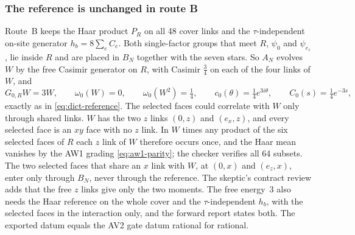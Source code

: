 \subsubsection{The reference is unchanged in route B}
\label{sec:ax2-reference}
Route~B keeps the Haar product $P_R$ on all 48 cover links and the
$\tau$-independent on-site generator $h_b=8\sum_eC_e$. Both single-factor
groups that meet $R$, $\psi_0$ and $\psi_{e_z}$, lie inside $R$ and are placed
in $B_N$ together with the seven stars. So $A_N$ evolves $W$ by the free
Casimir generator on $R$, with Casimir $\tfrac34$ on each of the four links
of $W$, and
\begin{equation}
 G_{0,R}W=3W,\qquad \omega_0(W)=0,\qquad \omega_0(W^2)=\tfrac14,\qquad
 c_0(\theta)=\tfrac14e^{3i\theta},\qquad C_0(s)=\tfrac14e^{-3s},
 \label{eq:ax2-reference}
\end{equation}
exactly as in \eqref{eq:dict-reference}. The selected faces could correlate
with $W$ only through shared links. $W$ has the two $z$ links $(0,z)$ and
$(e_x,z)$, and every selected face is an $xy$ face with no $z$ link. In $W$
times any product of the six selected faces of $R$ each $z$ link of $W$
therefore occurs once, and the Haar mean vanishes by the AW1 grading
\eqref{eq:aw1-parity}; the checker verifies all 64 subsets. The two selected
faces that share an $x$ link with $W$, at $(0,x)$ and $(e_z,x)$, enter only
through $B_N$, never through the reference. The skeptic's contract review
adds that the free $z$ links give only the two moments. The free energy~3
also needs the Haar reference on the whole cover and the $\tau$-independent
$h_b$, with the selected faces in the interaction only, and the forward report
states both. The exported datum equals the AV2 gate datum rational for
rational.

